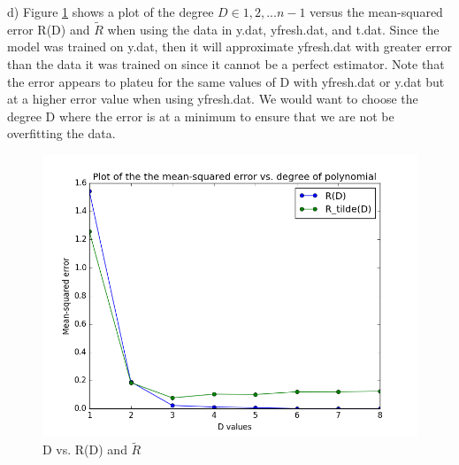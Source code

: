 \documentclass[11pt]{article}
\newenvironment{problem}[2][Problem]{\begin{trivlist}
\item[\hskip \labelsep {\bfseries #1}\hskip \labelsep {\bfseries #2.}]}{\end{trivlist}}
\begin{document}
\begin{problem}{2.1}
(d) Figure \ref{fig:2d} shows a plot of the degree $D \in {1,2,...n-1}$ versus the mean-squared error R(D) and $\tilde{R}$ when using the data in y.dat, yfresh.dat, and t.dat. Since the model was trained on y.dat, then it will approximate yfresh.dat with greater error than the data it was trained on since it cannot be a perfect estimator. Note that the error appears to plateu for the same values of D with yfresh.dat or y.dat but at a higher error value when using yfresh.dat. We would want to choose the degree D where the error is at a minimum to ensure that we are not be overfitting the data. 
\begin{figure}[h!]
  \centering
  \includegraphics[scale=0.5]{figs/2d.png}
  \caption{D vs. R(D) and $\tilde{R}$}
  \label{fig:2d}
\end{figure}


\end{problem}
\end{document}
